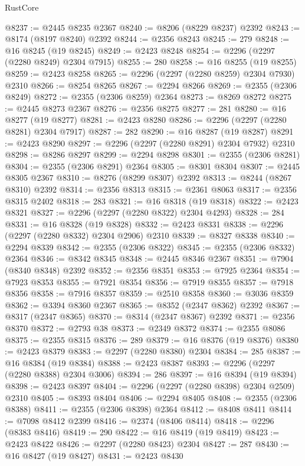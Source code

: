 \begin{lexlean}{RustCore}
\begin{coremodule}
@8237 := @2445 @8235 @2367
@8240 := @8206 (@8229 @8237) @2392
@8243 := @8174 (@8197 @8240) @2392
@8244 := @2356 @8243
@8245 := 279
@8248 := @16 @8245 (@19 @8245)
@8249 := @2423 @8248
@8254 := @2296 (@2297 (@2280 @8249) @2304 @7915)
@8255 := 280
@8258 := @16 @8255 (@19 @8255)
@8259 := @2423 @8258
@8265 := @2296 (@2297 (@2280 @8259) @2304 @7930) @2310
@8266 := @8254 @8265
@8267 := @2294 @8266
@8269 := @2355 (@2306 @8249)
@8272 := @2355 (@2306 @8259) @2364
@8273 := @8269 @8272
@8275 := @2445 @8273 @2367
@8276 := @2356 @8275
@8277 := 281
@8280 := @16 @8277 (@19 @8277)
@8281 := @2423 @8280
@8286 := @2296 (@2297 (@2280 @8281) @2304 @7917)
@8287 := 282
@8290 := @16 @8287 (@19 @8287)
@8291 := @2423 @8290
@8297 := @2296 (@2297 (@2280 @8291) @2304 @7932) @2310
@8298 := @8286 @8297
@8299 := @2294 @8298
@8301 := @2355 (@2306 @8281)
@8304 := @2355 (@2306 @8291) @2364
@8305 := @8301 @8304
@8307 := @2445 @8305 @2367
@8310 := @8276 (@8299 @8307) @2392
@8313 := @8244 (@8267 @8310) @2392
@8314 := @2356 @8313
@8315 := @2361 @8063
@8317 := @2356 @8315 @2402
@8318 := 283
@8321 := @16 @8318 (@19 @8318)
@8322 := @2423 @8321
@8327 := @2296 (@2297 (@2280 @8322) @2304 @4293)
@8328 := 284
@8331 := @16 @8328 (@19 @8328)
@8332 := @2423 @8331
@8338 := @2296 (@2297 (@2280 @8332) @2304 @2906) @2310
@8339 := @8327 @8338
@8340 := @2294 @8339
@8342 := @2355 (@2306 @8322)
@8345 := @2355 (@2306 @8332) @2364
@8346 := @8342 @8345
@8348 := @2445 @8346 @2367
@8351 := @7904 (@8340 @8348) @2392
@8352 := @2356 @8351
@8353 := @7925 @2364
@8354 := @7923 @8353
@8355 := @7921 @8354
@8356 := @7919 @8355
@8357 := @7918 @8356
@8358 := @7916 @8357
@8359 := @2510 @8358
@8360 := @3036 @8359
@8362 := @3394 @8360 @2367
@8365 := @8352 (@2347 @8362) @2392
@8367 := @8317 (@2347 @8365)
@8370 := @8314 (@2347 @8367) @2392
@8371 := @2356 @8370
@8372 := @2793 @38
@8373 := @2349 @8372
@8374 := @2355 @8086
@8375 := @2355 @8315
@8376 := 289
@8379 := @16 @8376 (@19 @8376)
@8380 := @2423 @8379
@8383 := @2297 (@2280 @8380) @2304
@8384 := 285
@8387 := @16 @8384 (@19 @8384)
@8388 := @2423 @8387
@8393 := @2296 (@2297 (@2280 @8388) @2304 @3006)
@8394 := 286
@8397 := @16 @8394 (@19 @8394)
@8398 := @2423 @8397
@8404 := @2296 (@2297 (@2280 @8398) @2304 @2509) @2310
@8405 := @8393 @8404
@8406 := @2294 @8405
@8408 := @2355 (@2306 @8388)
@8411 := @2355 (@2306 @8398) @2364
@8412 := @8408 @8411
@8414 := @7098 @8412 @2399
@8416 := @2374 (@8406 @8414)
@8418 := @2296 (@8383 @8416)
@8419 := 290
@8422 := @16 @8419 (@19 @8419)
@8423 := @2423 @8422
@8426 := @2297 (@2280 @8423) @2304
@8427 := 287
@8430 := @16 @8427 (@19 @8427)
@8431 := @2423 @8430

\end{coremodule}
\end{lexlean}
